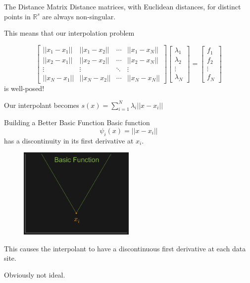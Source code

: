 \documentclass[12pt,t]{beamer}
\newcommand{\subt}[1]{{\footnotesize \color{subtitle} {#1}}}
\begin{document}
\begin{frame}{The Distance Matrix}
Distance matrices, with Euclidean distances, for distinct points in $\mathbb{R}^s$ are always non-singular.
\bigskip

This means that our interpolation problem

\begin{equation*}
\begin{bmatrix}
||x_1-x_1|| & ||x_1-x_2|| & \cdots & ||x_1-x_N||\\
||x_2-x_1|| & ||x_2-x_2||& \cdots & ||x_2-x_N||\\
\vdots & \vdots & \ddots & \vdots\\
||x_N-x_1|| & ||x_N-x_2||& \cdots & ||x_N-x_N||
\end{bmatrix}
\begin{bmatrix}
\lambda_1\\
\lambda_2\\
\vdots\\
\lambda_N
\end{bmatrix}
=
\begin{bmatrix}
f_1\\
f_2\\
\vdots\\
f_N
\end{bmatrix}
\end{equation*}
is well-posed!
\bigskip

Our interpolant becomes 
\subt{$s(x)=\sum_{i=1}^N \lambda_i ||x-x_i|| $}

\note{}
\end{frame}

\begin{frame}{Building a Better Basic Function}
Basic function
\begin{equation*}
\psi_i(x)=||x-x_i||
\end{equation*}
has a discontinuity in its first derivative at $x_i$.

\begin{figure}
\includegraphics[width=0.5\textwidth, keepaspectratio]{basicfunxi.png}
\end{figure}
This causes the interpolant to have a discontinuous first derivative at each data site. 

Obviously not ideal.

\note{}
\end{frame}
\end{document}
